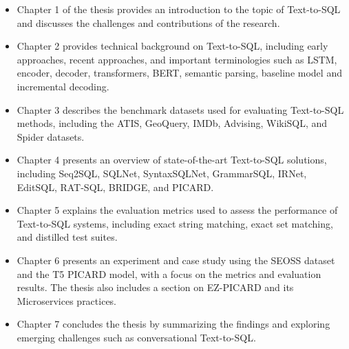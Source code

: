 \begin{itemize}
      \item Chapter 1 of the thesis provides an introduction to the topic of Text-to-SQL and discusses the challenges and contributions of the research.
      \item Chapter 2 provides technical background on Text-to-SQL, including early approaches, recent approaches, and important terminologies such as LSTM, encoder, decoder, transformers, BERT, semantic parsing, baseline model and incremental decoding.
      \item Chapter 3 describes the benchmark datasets used for evaluating Text-to-SQL methods, including the ATIS, GeoQuery, IMDb, Advising, WikiSQL, and Spider datasets.
      \item Chapter 4 presents an overview of state-of-the-art Text-to-SQL solutions, including Seq2SQL, SQLNet, SyntaxSQLNet, GrammarSQL, IRNet, EditSQL, RAT-SQL, BRIDGE, and PICARD.
      \item Chapter 5 explains the evaluation metrics used to assess the performance of Text-to-SQL systems, including exact string matching, exact set matching, and distilled test suites.
      \item Chapter 6 presents an experiment and case study using the SEOSS dataset and the T5 PICARD model, with a focus on the metrics and evaluation results. The thesis also includes a section on EZ-PICARD and its Microservices practices.
      \item Chapter 7 concludes the thesis by summarizing the findings and exploring emerging challenges such as conversational Text-to-SQL.
\end{itemize}
